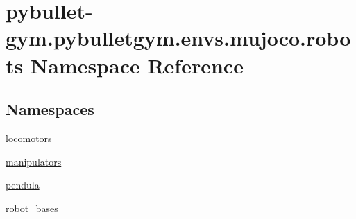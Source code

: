 \hypertarget{namespacepybullet-gym_1_1pybulletgym_1_1envs_1_1mujoco_1_1robots}{}\section{pybullet-\/gym.pybulletgym.\+envs.\+mujoco.\+robots Namespace Reference}
\label{namespacepybullet-gym_1_1pybulletgym_1_1envs_1_1mujoco_1_1robots}
\subsection*{Namespaces}
\begin{DoxyCompactItemize}
\item 
 \hyperlink{namespacepybullet-gym_1_1pybulletgym_1_1envs_1_1mujoco_1_1robots_1_1locomotors}{locomotors}
\item 
 \hyperlink{namespacepybullet-gym_1_1pybulletgym_1_1envs_1_1mujoco_1_1robots_1_1manipulators}{manipulators}
\item 
 \hyperlink{namespacepybullet-gym_1_1pybulletgym_1_1envs_1_1mujoco_1_1robots_1_1pendula}{pendula}
\item 
 \hyperlink{namespacepybullet-gym_1_1pybulletgym_1_1envs_1_1mujoco_1_1robots_1_1robot__bases}{robot\+\_\+bases}
\end{DoxyCompactItemize}
